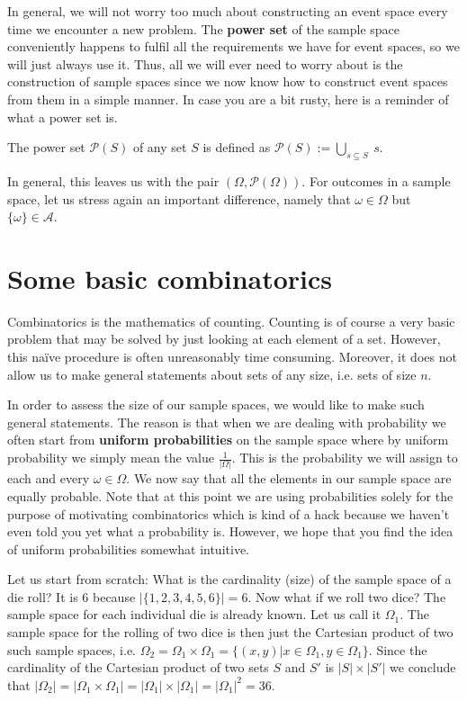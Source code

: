 In general, we will not worry too much about constructing an event space every time we encounter a new
problem. The \textbf{power set} of the sample space conveniently happens to fulfil all the requirements
we have for event spaces, so we will just always use it. Thus, all we will ever need to worry about
is the construction of sample spaces since we now know how to construct event spaces from them in a 
simple manner. In case you are a bit rusty, here is a reminder of what a power
set is.

\begin{Definition} 
The power set $ \mathcal{P}(S) $ of any set $ S $ is defined as $ \mathcal{P}(S) := \underset{s \subseteq S}{\bigcup}~s $.
\end{Definition}

In general, this leaves us with the pair $ (\Omega, \mathcal{P}(\Omega)) $. For outcomes in a sample space,
let us stress again an important difference, namely that $ \omega \in \Omega $ but 
$ \{\omega\} \in \mathcal{A}$.

\section{Some basic combinatorics}
Combinatorics is the mathematics of counting. Counting is of course a very basic problem that may
be solved by just looking at each element of a set. However, this na\"ive procedure is often
unreasonably time consuming. Moreover, it does not allow us to make general statements about sets of any 
size, i.e. sets of size $ n $.

In order to assess the size of our sample spaces, we would like to make such general statements. The reason
is that when we are dealing with probability we often start from \textbf{uniform probabilities} 
on the sample space where by uniform probability we simply mean the value $ \frac{1}{|\Omega|} $. This
is the probability we will assign to each and every $ \omega \in \Omega $. We now say that all the
elements in our sample space are equally probable. 
Note that at this point we are using probabilities solely for the purpose of motivating combinatorics which
is kind of a hack because we haven't even told you yet what a probability is. However, we hope that you
find the idea of uniform probabilities somewhat intuitive. 

Let us start from scratch: What is the cardinality (size) of the sample space of a die roll? It
is $ 6 $ because $ |\{1,2,3,4,5,6\}| = 6 $. Now what if we roll two dice? The sample space for each 
individual die is already known. Let us call it $ \Omega_{1} $. The sample space for the rolling of two dice
is then just the Cartesian product of two such sample spaces, i.e.
$ \Omega_{2} = \Omega_{1} \times \Omega_{1} = \{(x,y)|x \in \Omega_{1}, y \in \Omega_{1}\} $. Since
the cardinality of the Cartesian product of two sets $ S $ and $ S' $ is $ |S| \times |S'| $ we conclude
that $ |\Omega_{2}| = |\Omega_{1} \times \Omega_{1}| = |\Omega_{1}| \times |\Omega_{1}| 
= |\Omega_{1}|^{2} = 36 $.

